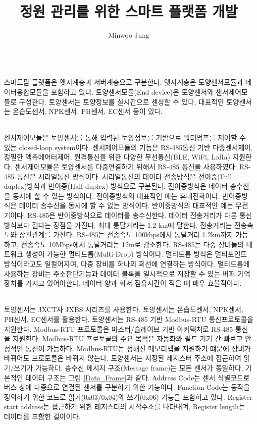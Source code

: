 \documentclass[11pt]{article}
\title{정원 관리를 위한 스마트 플랫폼 개발}
\author{Minwoo Jung}
\begin{document}
\maketitle
\indent \\스마트팜 플랫폼은 엣지계층과 서버계층으로 구분한다. 엣지계층은 토양센서모듈과 데이터융합모듈을 포함하고 있다.
토양센서모듈(End device)은 토양센서와 센서제어모듈로 구성한다. 토양센서는 토양정보를 실시간으로 센싱할 수 있다. 
대표적인 토양센서는 온습도센서, NPK센서, PH센서, EC센서 등이 있다.

\indent \\센서제어모듈은 토양센서를 통해 입력된 토양정보를 기반으로 워터펌프를 제어할 수 있는 closed-loop system이다. 센서제어모듈의 기능은 RS-485통신 기반 다중센서제어, 정밀한 액츄에어터제어, 원격통신을 위한 다양한 무선통신(BLE, WiFi, LoRa) 지원한다. 센서제어모듈은 토양센서를 다중연결하기 위해서 RS-485 통신을 사용하였다. RS-485 통신은 시리얼통신 방식이다. 시리얼통신의 데이터 전송방식은 전이중(Full duplex)방식과 반이중(Half duplex) 방식으로 구분된다. 전이중방식은 데이터 송수신을 동시에 할 수 있는 방식이다. 전이중방식의 대표적인 예는 휴대전화이다. 반이중방식은 데이터 송수신을 동시에 할 수 없는 방식이다. 반이중방식의 대표적인 예는 무전기이다. RS-485은 반이중방식으로 데이터를 송수신한다. 데이터 전송거리가 다른 통신방식보다 길다는 장점을 가진다. 최대 통달거리는 1.2 km에 달한다. 전송거리는 전송속도와 상관관계를 가진다. RS-485는 전송속도 100kbps에서 통달거리 1.2km까지 가능하고, 전송속도 10Mbps에서 통달거리는 12m로 감소한다. RS-485는 다중 장비들의 네트워크 생성이 가능한 멀티드롭(Multi-Drop) 방식이다. 멀티드롭 방식은 멀티포인트 방식이라고도 일컬어지며, 다중 장비를 하나의 회선에 연결하는 방식이다. 멀티드롭에 사용하는 장비는 주소판단기능과 데이터 블록을 일시적으로 저장할 수 있는 버퍼 기억장치를 가지고 있어야한다. 데이터 양과 회서 점유시간이 적을 떄 매우 효율적이다. 

\indent \\토양센서는 JXCT사 JXBS 시리즈를 사용한다. 토양센서는 온습도센서, NPK센서, PH센서, EC센서를 활용한다. 토양센서는 RS-485 기반 Modbus-RTU 통신프로토콜을 지원한다. Modbus-RTU 프로토콜은 마스터/슬레이브 기반 아키텍처로 RS-485 통신을 지원한다. Modbus-RTU 프로토콜의 주요 목적은 자동화와 필드 기기 간 빠르고 안정적인 통신이 가능하다. Modbus-RTU는 정해진 메모리맵을 지원하기 떄문에 장비가 바뀌어도 프로토콜은 바뀌지 않는다. 토양센서는 지정된 레지스터 주소에 접근하여 읽기/쓰기가 가능하다. 송수신 메시지 구조(Message frame)는 모든 센서가 동일하다. 기본적인 데이터 구조는 그림 \ref{Data_Frame}과 같다. Address Code는 센서 식별코드로 버스 상에 다중으로 연결된 센서를 구분하기 위한 기능이다. Function Code는 동작을 정의하기 위한 코드로 읽기(0x03/0x04)와 쓰기(0x06) 기능을 포함하고 있다.
Register start address는 접근하기 위한 레지스터의 시작주소를 나타내며, Register length는 데이터를 포함한 길이이다. 
\end{document}
